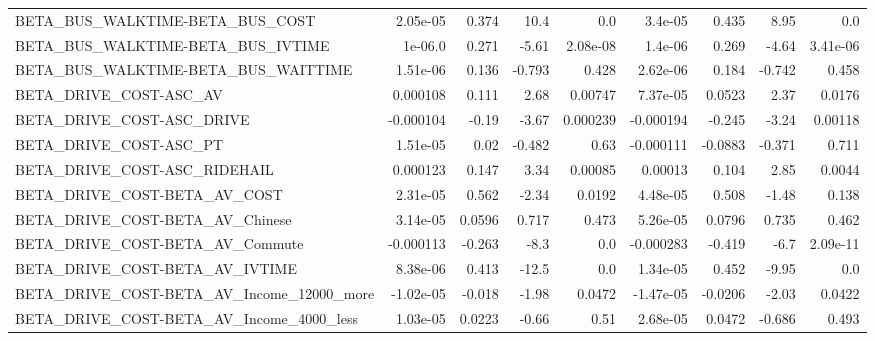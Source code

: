 \begin{tabular}{lrrrrrrrr}
BETA\_BUS\_WALKTIME-BETA\_BUS\_COST                    &    2.05e-05 &        0.374 &      10.4 &      0.0 &    3.4e-05 &       0.435 &         8.95 &           0.0 \\
BETA\_BUS\_WALKTIME-BETA\_BUS\_IVTIME                  &     1e-06.0 &        0.271 &     -5.61 & 2.08e-08 &    1.4e-06 &       0.269 &        -4.64 &      3.41e-06 \\
BETA\_BUS\_WALKTIME-BETA\_BUS\_WAITTIME                &    1.51e-06 &        0.136 &    -0.793 &    0.428 &   2.62e-06 &       0.184 &       -0.742 &         0.458 \\
BETA\_DRIVE\_COST-ASC\_AV                             &    0.000108 &        0.111 &      2.68 &  0.00747 &   7.37e-05 &      0.0523 &         2.37 &        0.0176 \\
BETA\_DRIVE\_COST-ASC\_DRIVE                          &   -0.000104 &        -0.19 &     -3.67 & 0.000239 &  -0.000194 &      -0.245 &        -3.24 &       0.00118 \\
BETA\_DRIVE\_COST-ASC\_PT                             &    1.51e-05 &         0.02 &    -0.482 &     0.63 &  -0.000111 &     -0.0883 &       -0.371 &         0.711 \\
BETA\_DRIVE\_COST-ASC\_RIDEHAIL                       &    0.000123 &        0.147 &      3.34 &  0.00085 &    0.00013 &       0.104 &         2.85 &        0.0044 \\
BETA\_DRIVE\_COST-BETA\_AV\_COST                       &    2.31e-05 &        0.562 &     -2.34 &   0.0192 &   4.48e-05 &       0.508 &        -1.48 &         0.138 \\
BETA\_DRIVE\_COST-BETA\_AV\_Chinese                    &    3.14e-05 &       0.0596 &     0.717 &    0.473 &   5.26e-05 &      0.0796 &        0.735 &         0.462 \\
BETA\_DRIVE\_COST-BETA\_AV\_Commute                    &   -0.000113 &       -0.263 &      -8.3 &      0.0 &  -0.000283 &      -0.419 &         -6.7 &      2.09e-11 \\
BETA\_DRIVE\_COST-BETA\_AV\_IVTIME                     &    8.38e-06 &        0.413 &     -12.5 &      0.0 &   1.34e-05 &       0.452 &        -9.95 &           0.0 \\
BETA\_DRIVE\_COST-BETA\_AV\_Income\_12000\_more          &   -1.02e-05 &       -0.018 &     -1.98 &   0.0472 &  -1.47e-05 &     -0.0206 &        -2.03 &        0.0422 \\
BETA\_DRIVE\_COST-BETA\_AV\_Income\_4000\_less           &    1.03e-05 &       0.0223 &     -0.66 &     0.51 &   2.68e-05 &      0.0472 &       -0.686 &         0.493 \\

\end{tabular}
